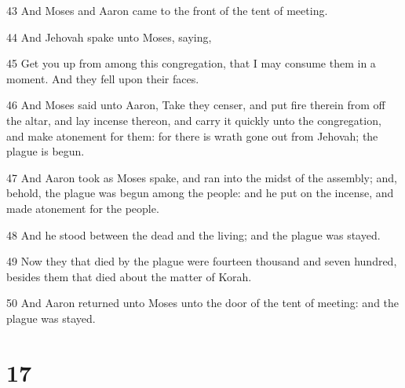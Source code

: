 \par 43 And Moses and Aaron came to the front of the tent of meeting.
\par 44 And Jehovah spake unto Moses, saying,
\par 45 Get you up from among this congregation, that I may consume them in a moment. And they fell upon their faces.
\par 46 And Moses said unto Aaron, Take they censer, and put fire therein from off the altar, and lay incense thereon, and carry it quickly unto the congregation, and make atonement for them: for there is wrath gone out from Jehovah; the plague is begun.
\par 47 And Aaron took as Moses spake, and ran into the midst of the assembly; and, behold, the plague was begun among the people: and he put on the incense, and made atonement for the people.
\par 48 And he stood between the dead and the living; and the plague was stayed.
\par 49 Now they that died by the plague were fourteen thousand and seven hundred, besides them that died about the matter of Korah.
\par 50 And Aaron returned unto Moses unto the door of the tent of meeting: and the plague was stayed.

\chapter{17}


